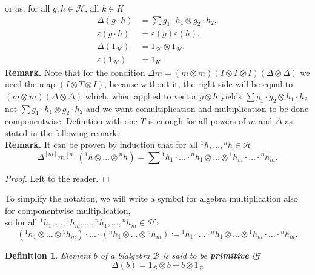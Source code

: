 \documentclass[a4paper, 12pt]{article}
\newtheorem{definition}{Definition}
\begin{document}
or as: for all $g, h \in \mathcal{H}$, all $k \in K$
\begin{align*}
\Delta(g \cdot h) &= \sum g_1 \cdot h_1 \otimes g_2 \cdot h_2, \\
\varepsilon(g \cdot h) &= \varepsilon(g)\varepsilon(h), \\
\Delta (1_\mathcal{H}) &= 1_\mathcal{H} \otimes 1_\mathcal{H}, \\
\varepsilon (1_\mathcal{H}) &= 1_K.
\end{align*}
\textbf{Remark. } Note that for the condition
$\Delta m = (m\otimes m)(I \otimes T \otimes I)(\Delta \otimes \Delta)$
we need the map $(I \otimes T \otimes I)$, because without it, the right side will be equal to
$(m \otimes m)(\Delta \otimes \Delta)$ which, when applied to vector $g \otimes h$ yields
$\displaystyle\sum g_1 \cdot g_2 \otimes h_1 \cdot h_2$ not $\sum g_1 \cdot h_1 \otimes g_2 \cdot h_2$
and we want comultiplication and multiplication to be done componentwise. Definition with
one $T$ is enough for all powers of $m$ and $\Delta$ as stated in the following remark:\\
\textbf{Remark. } It can be proven by induction that for all ${^1h}, \dots, {^nh} \in \mathcal{H}$
\begin{equation}
\Delta^{[m]}m^{[n]}({^1h} \otimes \dots \otimes {^nh}) = \sum {^1h}_1 \cdot \ldots \cdot {^nh}_1
\otimes \dots \otimes {^1h}_m\cdot  \ldots \cdot {^nh}_m.
\end{equation}
\begin{proof}
Left to the reader.
\end{proof}
To simplify the notation, we will write a symbol for algebra multiplication also for componentwise
multiplication, \\ so for all ${^1h}_1, \dots, {^1h}_m, \dots, {^nh}_1, \dots , {^nh}_m \in \mathcal{H}$:
\begin{equation}
({^1h}_1\otimes \dots \otimes {^1h}_m)\cdot \ldots \cdot ({^nh}_1 \otimes \dots \otimes {^nh}_m) \coloneqq
{^1h}_1 \cdot \ldots \cdot {^nh}_1 \otimes \dots \otimes {^1h}_m\cdot  \ldots \cdot {^nh}_m.
\end{equation}
\begin{definition}
Element $b$ of a bialgebra $\mathcal{B}$ is said to be \textbf{primitive} iff
\begin{equation*}
\Delta(b) = 1_\mathcal{B} \otimes b + b \otimes 1_\mathcal{B}
\end{equation*}
\end{definition}
\end{document}
